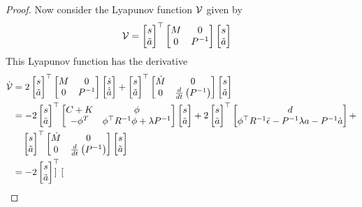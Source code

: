\begin{proof}

Now consider the Lyapunov function $\mathcal{V}$ given by
\begin{align}
    \mathcal{V} &= \begin{bmatrix}  s \\ \tilde{ a} \end{bmatrix}^\top
        \begin{bmatrix}
            M & 0 \\
            0 & P^{-1}
        \end{bmatrix}
        \begin{bmatrix}  s \\ \tilde{ a} \end{bmatrix}
\end{align}
This Lyapunov function has the derivative
\begin{align}
    \dot{\lyap} &= 2 \stackedstate^\top 
        \begin{bmatrix}
            M & 0 \\
            0 & P\inv
        \end{bmatrix}
        \stackedstatedot
        +
        \stackedstate^\top 
        \begin{bmatrix}
            \dot M & 0 \\
            0 & \frac{d}{dt}\left(P\inv \right) 
        \end{bmatrix}
        \stackedstate
    \\ &=
        - 2 \stackedstate^\top
        \begin{bmatrix}
            C + K & \phi \\
            -\phi^T & \phi^\top R\inv \phi + \lambda P \inv \\ %
        \end{bmatrix}
        \begin{bmatrix}
            \BB s \\ \tilde{\BB a}
        \end{bmatrix}
        + 2 \stackedstate^\top
        \begin{bmatrix}
            \BB d \\
            \phi^\top R\inv \bar{\epsilon} - P\inv \lambda \BB a - P\inv \dot{\BB a}
        \end{bmatrix}
        +
        \\&\quad
        \stackedstate^\top 
        \begin{bmatrix}
            \dot M & 0 \\
            0 & \frac{d}{dt}\left(P\inv \right)
        \end{bmatrix}
        \stackedstate
    \\ &=
        - 2 \stackedstate^\top
        \begin{bmatrix}

\end{bmatrix}
\end{align}
\end{proof}
